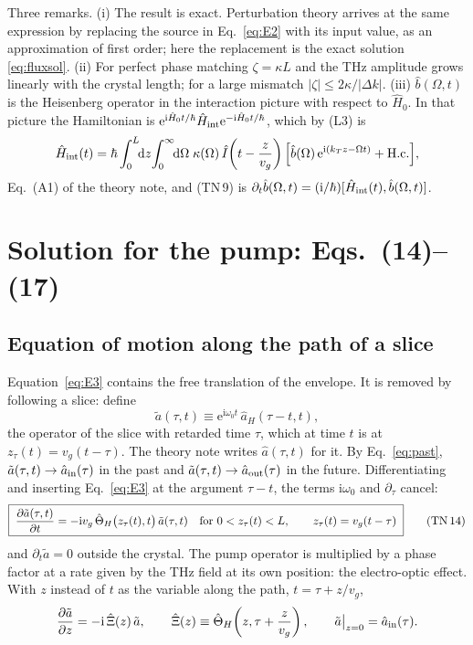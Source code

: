 \documentclass[aps,pra,onecolumn,notitlepage,11pt,amsmath,amssymb,nofootinbib]{revtex4-2}
\newcommand{\Iop}{\hat I}
\newcommand{\dd}{\mathrm{d}}
\newcommand{\ee}{\mathrm{e}}
\newcommand{\ii}{\mathrm{i}}
\newcommand{\TN}[1]{\text{TN\,#1}}
\begin{document}
Three remarks. (i) The result is exact. Perturbation theory arrives at the
same expression by replacing the source in Eq.~\eqref{eq:E2} with its input
value, as an approximation of first order; here the replacement is the exact
solution \eqref{eq:fluxsol}. (ii) For perfect phase matching $\zeta=\kappa L$
and the THz amplitude grows linearly with the crystal length; for a large
mismatch $|\zeta|\le2\kappa/|\Delta k|$. (iii) $\hat b(\Omega,t)$ is the
Heisenberg operator in the interaction picture with respect to $\hat H_0$.
In that picture the Hamiltonian is
$\ee^{\ii\hat H_0t/\hbar}\hat H_{\rm int}\ee^{-\ii\hat H_0t/\hbar}$, which by (L3)
is
\begin{equation}
\hat H_{\rm int}(t)=\hbar\int_0^L\!\!\dd z\!\int_0^\infty\!\!\dd\Omega\;\kappa(\Omega)\,
\Iop\!\left(t-\frac{z}{v_g}\right)\Big[\hat b(\Omega)\,\ee^{\ii(k_Tz-\Omega t)}+\mathrm{H.c.}\Big],
\label{eq:HintI}
\end{equation}
Eq.~(A1) of the theory note, and (TN\,9) is
$\partial_t\hat b(\Omega,t)=(\ii/\hbar)[\hat H_{\rm int}(t),\hat b(\Omega,t)]$.

\section{Solution for the pump: Eqs.~(14)--(17)}
\label{sec:a}

\subsection{Equation of motion along the path of a slice}
\label{sec:pumpeom}

Equation~\eqref{eq:E3} contains the free translation of the envelope. It is
removed by following a slice: define
\begin{equation}
\tilde a(\tau,t)\equiv\ee^{\ii\omega_0t}\,\hat a_H(\tau-t,t),
\end{equation}
the operator of the slice with retarded time $\tau$, which at time $t$ is at
$z_\tau(t)=v_g(t-\tau)$. The theory note writes $\hat a(\tau,t)$ for it. By
Eq.~\eqref{eq:past}, $\tilde a(\tau,t)\to\hat a_{\rm in}(\tau)$ in the past and
$\tilde a(\tau,t)\to\hat a_{\rm out}(\tau)$ in the future. Differentiating and
inserting Eq.~\eqref{eq:E3} at the argument $\tau-t$, the terms
$\ii\omega_0$ and $\partial_\tau$ cancel:
\begin{equation}
\boxed{\;\frac{\partial\tilde a(\tau,t)}{\partial t}
=-\ii v_g\,\hat\Theta_H\big(z_\tau(t),t\big)\,\tilde a(\tau,t)
\quad\text{for }0<z_\tau(t)<L,\qquad z_\tau(t)=v_g(t-\tau)\;}
\tag{\TN{14}}
\end{equation}
and $\partial_t\tilde a=0$ outside the crystal. The pump operator is
multiplied by a phase factor at a rate given by the THz field at its own
position: the electro-optic effect. With $z$ instead of $t$ as the variable
along the path, $t=\tau+z/v_g$,
\begin{equation}
\frac{\partial\tilde a}{\partial z}=-\ii\,\hat\Xi(z)\,\tilde a,\qquad
\hat\Xi(z)\equiv\hat\Theta_H\!\left(z,\tau+\frac{z}{v_g}\right),\qquad
\tilde a\big|_{z=0}=\hat a_{\rm in}(\tau).
\label{eq:pathode}
\end{equation}
\end{document}

